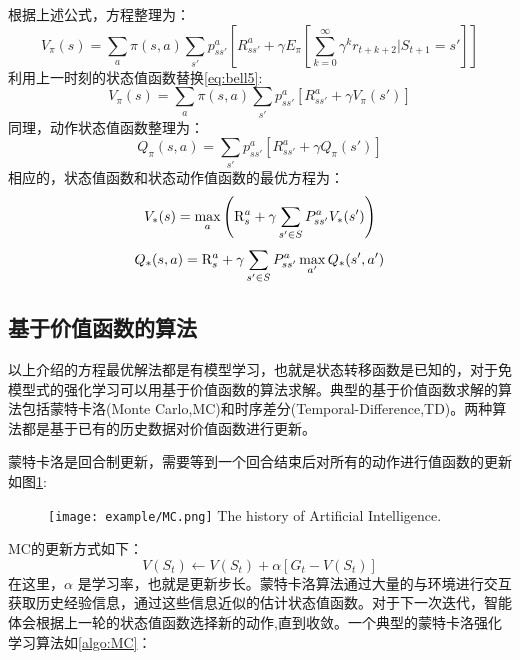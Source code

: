 根据上述公式，方程整理为：
\begin{equation}
\label{eq:bell5}
{V_\pi }(s) = \sum\limits_a {\pi (s,a)\sum\limits_{s'} {p_{ss'}^a} } [R_{ss'}^a + \gamma {E_\pi }[\sum\limits_{k = 0}^\infty  {{\gamma ^k}{r_{t + k + 2}}|{S_{t + 1}}}  = s']]
\end{equation}
利用上一时刻的状态值函数替换\ref{eq:bell5}:
\begin{equation}
\label{eq:bell6}
{V_\pi }(s) = \sum\limits_a {\pi (s,a)\sum\limits_{s'} {p_{ss'}^a} } [R_{ss'}^a + \gamma {V_\pi }(s')]
\end{equation}
同理，动作状态值函数整理为：
\begin{equation}
\label{eq:bell7}
{Q_\pi }(s,a) = \sum\limits_{s'} {p_{ss'}^a} [R_{ss'}^a + \gamma {Q_\pi }(s')]
\end{equation}
相应的，状态值函数和状态动作值函数的最优方程为：
\begin{equation}
\label{eq:bell8}
{V_*}(s) = \mathop {\max }\limits_a \left( {{\rm{R}}_s^a + \gamma \sum\limits_{s' \in S} {P_{ss'}^a{V_*}(s')} } \right)
\end{equation}
\begin{equation}
\label{eq:bell9}
{Q_*}(s,a) = {\rm{R}}_s^a + \gamma \sum\limits_{s' \in S} {P_{ss'}^a\mathop {\max }\limits_{a'} {Q_*}(s',a')}
\end{equation}
\subsection{基于价值函数的算法}
以上介绍的方程最优解法都是有模型学习，也就是状态转移函数是已知的，对于免模型式的强化学习可以用基于价值函数的算法求解。典型的基于价值函数求解的算法包括蒙特卡洛(Monte Carlo,MC)\cite{singh1996reinforcement}和时序差分(Temporal-Difference,TD)\cite{tesauro1995temporal}。两种算法都是基于已有的历史数据对价值函数进行更新。

蒙特卡洛是回合制更新，需要等到一个回合结束后对所有的动作进行值函数的更新如图\ref{fig:5}:
\begin{figure}[htpb]
	\centering
	\texttt{[image: example/MC.png]}
	{The history of Artificial Intelligence.}
	\label{fig:5}
\end{figure}
MC的更新方式如下：
\begin{equation}
\label{eq:mc}
V({S_t}) \leftarrow V({S_t}) + \alpha [{G_t} - V({S_t})]
\end{equation}
在这里，$\alpha$ 是学习率，也就是更新步长。蒙特卡洛算法通过大量的与环境进行交互获取历史经验信息，通过这些信息近似的估计状态值函数。对于下一次迭代，智能体会根据上一轮的状态值函数选择新的动作,直到收敛。一个典型的蒙特卡洛强化学习算法如\ref{algo:MC}：

